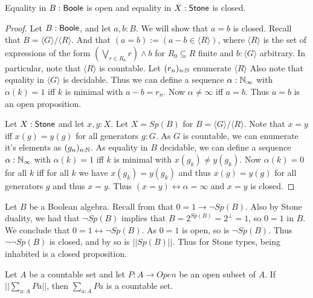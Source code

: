 \begin{lemma}\label{EqualityBooleStoneClosedOpen}
  Equality in $B:\mathsf{Boole}$ is open and equality in $X:\mathsf{Stone}$ is closed. 
\end{lemma}
\begin{proof}
  Let $B:\mathsf{Boole}$, and let $a,b:B$. We will show that $a=b$ is closed. 
  Recall that $B = \langle G \rangle / \langle R \rangle$. 
  And that $(a=b):= (a-b \in \langle R \rangle)$, 
  where $\langle R \rangle$ is the set of expressions of the form
  $(\bigvee_{r\in R_0} r) \wedge b$ for $R_0\subseteq R$ finite and $b:\langle G \rangle$ 
  arbitrary. 
  In particular, note that $\langle R \rangle$ is countable. 
  Let $(r_n)_{n:\mathbb{N}}$ enumerate $ \langle R \rangle $
  Also note that equality in $\langle G \rangle$ is decidable. 
  Thus we can define a sequence $\alpha:\mathbb{N}_{\infty}$ with $\alpha(k) = 1$ 
  iff $k$ is minimal with $a -b = r_n$. 
  Now $\alpha \neq \infty $ iff $a = b$. Thus $a=b$ is an open proposition. 

  Let $X:\mathsf{Stone}$ and let $x,y:X$. 
  Let $X= Sp(B)$ for $B = \langle G \rangle / \langle R \rangle $. 
  Note that $x=y$ iff $x(g) = y(g)$ for all generators $g:G$. 
  As $G$ is countable, we can enumerate it's elements as $(g_n)_{n:\mathbb{N}}$. 
  As equality in $B$ decidable, we can define a sequence $\alpha:\mathbb{N}_{\infty}$ 
  with $\alpha(k) = 1$ iff $k$ is minimal with $x(g_k) \neq y(g_k)$. 
  Now $\alpha(k) = 0$ for all $k$ iff for all $k$ we have $x(g_k) = y(g_k)$ and thus $x(g) = y(g)$ for all generators $g$ 
  and thus $ x= y$. 
  Thus $(x=y) \leftrightarrow \alpha= \infty$ and $ x=y$ is closed. 
\end{proof}
\begin{corollary}\label{LemInhabitedOfStoneIsClosed}
  Let $B$ be a Boolean algebra.
  Recall from  that $0=1 \to \neg Sp(B)$. 
  Also by Stone duality, we had that $\neg Sp(B)$ implies that 
  $B = 2^{Sp(B)} = 2^\bot= 1$, so $0=1$ in $B$. 
  We conclude that $0=1 \leftrightarrow \neg Sp(B)$. 
  As $0=1$ is open, so is $\neg Sp(B)$. 
  Thus $\neg \neg Sp(B)$ is closed, and by  
  so is $||Sp(B)||$. 
  Thus for Stone types, being inhabited is a closed proposition. 
\end{corollary}
\begin{lemma}
  Let $A$ be a countable set and let $P:A \to Open$
  be an open subset of $A$. 
  If $||\sum_{a:A} P a||$, then $\sum_{a:A} P a$ is a countable set. 
\end{lemma}
